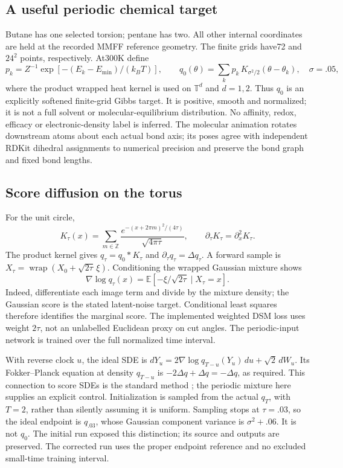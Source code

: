 \subsection{A useful periodic chemical target}
Butane has one selected torsion; pentane has two. All other internal coordinates
are held at the recorded MMFF reference geometry. The finite grids have72 and
$24^2$ points, respectively. At300K define
\[
 p_k=Z^{-1}\exp[-(E_k-E_{\min})/(k_BT)],\qquad
 q_0(\theta)=\sum_k p_k\,K_{\sigma^2/2}(\theta-\theta_k),\quad \sigma=.05,
\]
where the product wrapped heat kernel is used on $\mathbb T^d$ and $d=1,2$.
Thus $q_0$ is an explicitly softened finite-grid Gibbs target. It is positive,
smooth and normalized; it is not a full solvent or molecular-equilibrium
distribution. No affinity, redox, efficacy or electronic-density label is inferred.
The molecular animation rotates downstream atoms about each actual bond axis;
its poses agree with independent RDKit dihedral assignments to numerical
precision and preserve the bond graph and fixed bond lengths.

\subsection{Score diffusion on the torus}
For the unit circle,
\[
 K_\tau(x)=\sum_{m\in\mathbb Z}\frac{e^{-(x+2\pi m)^2/(4\tau)}}{\sqrt{4\pi\tau}},
 \qquad \partial_\tau K_\tau=\partial_x^2K_\tau.
\]
The product kernel gives $q_\tau=q_0*K_\tau$ and
$\partial_\tau q_\tau=\Delta q_\tau$. A forward sample is
$X_\tau=\operatorname{wrap}(X_0+\sqrt{2\tau}\,\xi)$.
Conditioning the wrapped Gaussian mixture shows
\[
 \nabla\log q_\tau(x)
 =\mathbb E[-\xi/\sqrt{2\tau}\mid X_\tau=x].
\]
Indeed, differentiate each image term and divide by the mixture density;
the Gaussian score is the stated latent-noise target. Conditional least
squares therefore identifies the marginal score. The implemented weighted
DSM loss uses weight $2\tau$, not an unlabelled Euclidean proxy on cut angles.
The periodic-input network is trained over the full normalized time interval.

With reverse clock $u$, the ideal SDE is
$dY_u=2\nabla\log q_{T-u}(Y_u)\,du+\sqrt2\,dW_u$.
Its Fokker--Planck equation at density $q_{T-u}$ is
$-2\Delta q+\Delta q=-\Delta q$, as required. This connection to score SDEs
is the standard method \cite{VisScore}; the periodic mixture here supplies an
explicit control. Initialization is sampled from the actual $q_T$, with $T=2$,
rather than silently assuming it is uniform. Sampling stops at $\tau=.03$,
so the ideal endpoint is $q_{.03}$, whose Gaussian component variance is
$\sigma^2+.06$. It is not $q_0$. The initial run exposed this distinction;
its source and outputs are preserved. The corrected run uses the proper endpoint
reference and no excluded small-time training interval.

